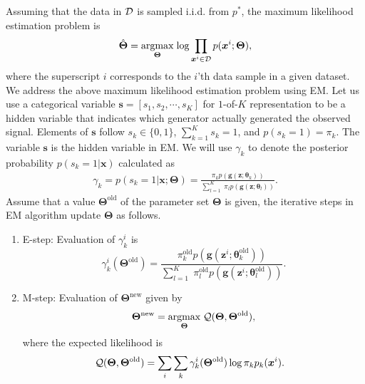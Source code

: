 Assuming that the data in $\mathcal{D}$ is sampled i.i.d. from $p^{\ast}$, the maximum likelihood estimation problem is
\begin{equation}\label{eq:max-genmm}
  \hat{\bm{\Theta}} = \underset{\bm{\Theta}}{\operatorname{argmax}}\;{\log{\prod_{\bm{x}^{i} \in \mathcal{D}} p(\bm{x}^{i};\bm{\Theta})}},
\end{equation}
where the superscript $i$ corresponds to the $i$'th data sample in a given dataset.
We address the above maximum likelihood estimation problem using EM. 
Let us use a categorical variable $\bm{s} = [s_1, s_2, \cdots, s_K]$
for $1$-of-$K$ representation to be a hidden variable that indicates which generator actually generated the observed signal. Elements of $\bm{s}$ follow $s_k \in \{0,1\}$, $\sum_{k=1}^K s_k =1$, and $p(s_k=1)=\pi_k$. The variable $\bm{s}$ is the hidden variable in EM. We will use $\gamma_k$ to denote the posterior probability $p(s_k =1|\bm{x})$ calculated as
\begin{align}\label{eq-genmm-gamma-org}
  \gamma_k = p(s_k =1|\bm{x};\bm{\Theta}) 
  = \frac{\pi_k p(\bm{g}(\bm{z};\bm{\theta}_k))}{\sum_{l=1}^K\; \pi_l p(\bm{g}(\bm{z};\bm{\theta}_l))}.
\end{align}
Assume that a value $\bm{\Theta}^{\mathrm{old}}$ of the parameter set $\bm{\Theta}$ is given, the iterative steps in EM algorithm update $\bm{\Theta}$ as follows.
\begin{enumerate}
\item E-step: Evaluation of $\gamma_{k}^{i}$ is 
  \begin{equation}\label{eq-genmm-e-step}
    \gamma_{k}^{i}(\bm{\Theta}^{\mathrm{old}}) = \frac{\pi_k^\mathrm{{old}} p(\bm{g}(\bm{z}^{i};\bm{\theta}_k^{\mathrm{old}}))}{\sum_{l=1}^K\; \pi_l^\mathrm{{old}} p(\bm{g}(\bm{z}^{i};\bm{\theta}_l^{\mathrm{old}}))}.   
  \end{equation}
\item M-step: Evaluation of $\bm{\Theta}^{\mathrm{new}}$ given by
  \begin{equation}\label{eq-genmm-opt}
    \bm{\Theta}^{\mathrm{new}} =   \underset{\bm{\Theta}}{\operatorname{argmax}}\;{\mathcal{Q} (\bm{\Theta},\bm{\Theta}^{\mathrm{old}})}, 
  \end{equation}
  where the expected likelihood is
  \begin{equation}
    \hspace{-8pt}\mathcal{Q} (\bm{\Theta},\bm{\Theta}^{\mathrm{old}}) = \sum_{i}\sum_{k} \gamma_{k}^{i}(\bm{\Theta}^{\mathrm{old}}) \log \pi_k p_k(\bm{x}^{i}).
  \end{equation}
\end{enumerate}

